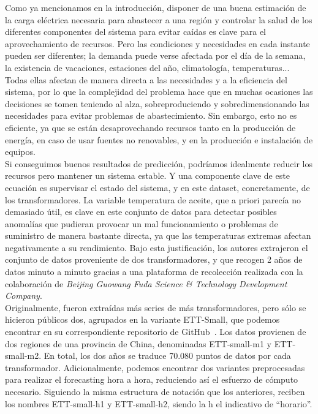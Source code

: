 Como ya mencionamos en la introducción, disponer de una buena estimación de la carga eléctrica necesaria para abastecer a una región y controlar la salud de los diferentes componentes del sistema para evitar caídas es clave para el aprovechamiento de recursos. Pero las condiciones y necesidades en cada instante pueden ser diferentes; la demanda puede verse afectada por el día de la semana, la existencia de vacaciones, estaciones del año, climatología, temperaturas... Todas ellas afectan de manera directa a las necesidades y a la eficiencia del sistema, por lo que la complejidad del problema hace que en muchas ocasiones las decisiones se tomen teniendo al alza, sobreproduciendo y sobredimensionando las necesidades para evitar problemas de abastecimiento. Sin embargo, esto no es eficiente, ya que se están desaprovechando recursos tanto en la producción de energía, en caso de usar fuentes no renovables, y en la producción e instalación de equipos.\\

Si conseguimos buenos resultados de predicción, podríamos idealmente reducir los recursos pero mantener un sistema estable. Y una componente clave de este ecuación es supervisar el estado del sistema, y en este dataset, concretamente, de los transformadores. La variable temperatura de aceite, que a priori parecía no demasiado útil, es clave en este conjunto de datos para detectar posibles anomalías que pudieran provocar un mal funcionamiento o problemas de suministro de manera bastante directa, ya que las temperaturas extremas afectan negativamente a su rendimiento. Bajo esta justificación, los autores extrajeron el conjunto de datos proveniente de dos transformadores, y que recogen 2 años de datos minuto a minuto gracias a una plataforma de recolección realizada con la colaboración de \textit{Beijing Guowang Fuda Science \& Technology Development Company}.\\

Originalmente, fueron extraídas más series de más transformadores, pero sólo se hicieron públicos dos, agrupados en la variante ETT-Small, que podemos encontrar en su correspondiente repositorio de GitHub~\cite{zhou2021etdataset}. Los datos provienen de dos regiones de una provincia de China, denominadas ETT-small-m1 y ETT-small-m2. En total, los dos años se traduce 70.080 puntos de datos por cada transformador. Adicionalmente, podemos encontrar dos variantes preprocesadas para realizar el forecasting hora a hora, reduciendo así el esfuerzo de cómputo necesario. Siguiendo la misma estructura de notación que los anteriores, reciben los nombres ETT-small-h1 y ETT-small-h2, siendo la h el indicativo de ``horario''.\\


